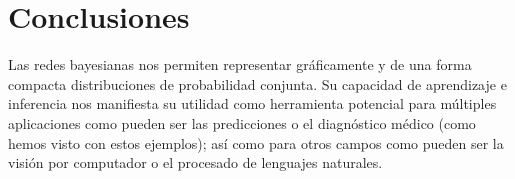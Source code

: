 \documentclass[a4paper]{article}
\begin{document}
\section{Conclusiones}
\quad Las redes bayesianas nos permiten representar gráficamente y de una forma compacta distribuciones de probabilidad conjunta. Su capacidad de aprendizaje e inferencia nos manifiesta su utilidad como herramienta potencial para múltiples aplicaciones como pueden ser las predicciones o el diagnóstico médico (como hemos visto con estos ejemplos); así como para otros campos como pueden ser la visión por computador o el procesado de lenguajes naturales.
\end{document}
